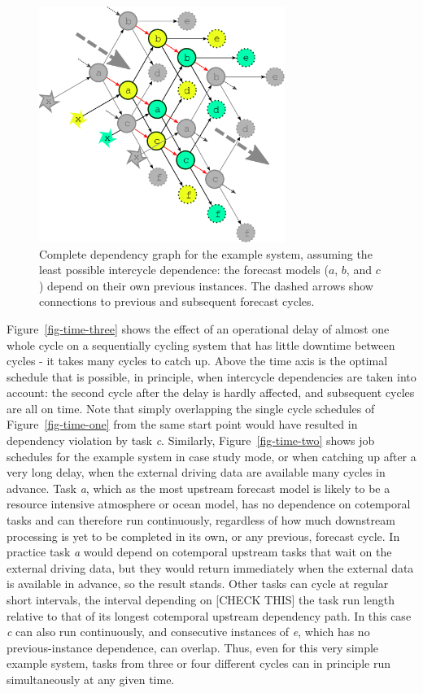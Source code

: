 \documentclass[11pt,a4paper]{article}
\begin{document}
\begin{figure} \label{fig-dep-two}
    \begin{center}
        \includegraphics[width=8cm]{inkscape-svg/dep-multi-cycle} 
    \end{center}
    \caption{\small Complete dependency graph for the example
    system, assuming the least possible intercycle dependence: the
    forecast models ($a$, $b$, and $c$) depend on their own previous
    instances. The dashed arrows show connections to previous and
    subsequent forecast cycles.} 
\end{figure}



Figure~\ref{fig-time-three} shows the effect of an operational delay of
almost one whole cycle on a sequentially cycling system that has little
downtime between cycles - it takes many cycles to catch up. Above the
time axis is the optimal schedule that is possible, in principle, when
intercycle dependencies are taken into account: the second cycle after
the delay is hardly affected, and subsequent cycles are all on time.
Note that simply overlapping the single cycle schedules of 
Figure~\ref{fig-time-one} from the same start point would have resulted in
dependency violation by task {\em c}. Similarly,
Figure~\ref{fig-time-two} shows job schedules for the example system in
case study mode, or when catching up after a very long delay, when the
external driving data are available many cycles in advance.  Task {\em
a}, which as the most upstream forecast model is likely to be a resource
intensive atmosphere or ocean model, has no dependence on cotemporal
tasks and can therefore run continuously, regardless of how much
downstream processing is yet to be completed in its own, or any
previous, forecast cycle. In practice task {\em a} would depend on
cotemporal upstream tasks that wait on the external driving data, but
they would return immediately when the external data is available in
advance, so the result stands. Other tasks can cycle at regular short
intervals, the interval depending on [CHECK THIS] the task run length
relative to that of its longest cotemporal upstream dependency path. In
this case {\em c} can also run continuously, and consecutive instances
of {\em e}, which has no previous-instance dependence, can overlap.
Thus, even for this very simple example system, tasks from three or four
different cycles can in principle run simultaneously at any given
time. 
\end{document}
